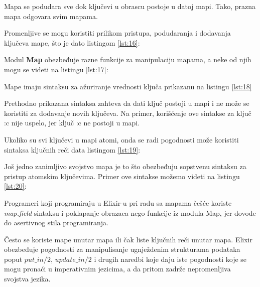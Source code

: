 \documentclass[12pt,oneside]{memoir}
\begin{document}


Mapa se podudara sve dok ključevi u obrascu postoje u datoj mapi. Tako, prazna mapa odgovara svim mapama.

Promenljive se mogu koristiti prilikom pristupa, podudaranja i dodavanja ključeva mape, što je dato listingom \ref{lst:16}:

\newpage



Modul \textbf{Map} obezbeđuje razne funkcije za manipulaciju mapama, a neke od njih mogu se videti na listingu \ref{lst:17}:



Mape imaju sintaksu za ažuriranje vrednosti ključa prikazanu na listingu \ref{lst:18}



Prethodno prikazana sintaksa zahteva da dati ključ postoji u mapi i ne može se koristiti za dodavanje novih ključeva. Na primer, korišćenje ove sintakse za ključ :c nije uspelo, jer ključ :c ne postoji u mapi.

Ukoliko su svi ključevi u mapi atomi, onda se radi pogodnosti može koristiti sintaksa ključnih reči data listingom \ref{lst:19}:



Još jedno zanimljivo svojstvo mapa je to što obezbeđuju sopstvenu sintaksu za pristup atomskim ključevima. Primer ove sintakse možemo videti na listingu \ref{lst:20}:



Programeri koji programiraju u Elixir-u pri radu sa mapama češće koriste \textit{map.field} sintaksu i poklapanje obrazaca nego funkcije iz modula Map, jer dovode do asertivnog stila programiranja.

Često se koriste mape unutar mapa ili čak liste ključnih reči unutar mapa. Elixir obezbeđuje pogodnosti za manipulisanje ugnježdenim strukturama podataka poput $put\_in/2$, $update\_in/2$ i drugih naredbi koje daju iste pogodnosti koje se mogu pronaći u imperativnim jezicima, a da pritom zadrže nepromenljiva svojstva jezika.
\end{document}
